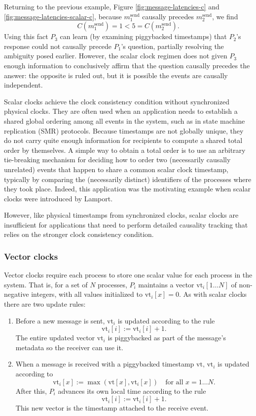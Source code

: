 \documentclass[]             %
{NASA}                       %
\theoremstyle{definition}
\begin{document}
Returning to the previous example, Figure \ref{fig:message-latencies-c} and
\ref{fig:message-latencies-scalar-c}, because $m_1^\textrm{send}$
causally precedes $m_2^\textrm{send}$, we find
\[C(m_1^\textrm{send}) = 1 < 5 = C(m_2^\textrm{send}).\] Using this
fact $P_3$ can learn (by examining piggybacked timestamps) that
$P_2$'s response could not causally precede $P_1$'s question,
partially resolving the ambiguity posed earlier. However, the scalar
clock regimen does not given $P_3$ enough information to conclusively
affirm that the question causally precedes the answer: the opposite is
ruled out, but it is possible the events are causally independent.

Scalar clocks achieve the clock consistency condition without
synchronized physical clocks. They are often used when an application
needs to establish a shared global ordering among all events in the
system, such as in state machine replication (SMR) protocols. Because
timestamps are not globally unique, they do not carry quite enough
information for recipients to compute a shared total order by
themselves. A simple way to obtain a total order is to use an
arbitrary tie-breaking mechanism for deciding how to order two
(necessarily causally unrelated) events that happen to share a common
scalar clock timestamp, typically by comparing the (necessarily
distinct) identifiers of the processes where they took place. Indeed,
this application was the motivating example when scalar clocks were
introduced by Lamport.

However, like physical timestamps from synchronized clocks, scalar
clocks are insufficient for applications that need to perform detailed
causality tracking that relies on the stronger clock consistency
condition.

\subsubsection{Vector clocks}
\newcommand{\vt}{\textrm{vt}}

Vector clocks require each process to store one scalar value for each
process in the system. That is, for a set of $N$ processes, $P_i$
maintains a vector $\vt_i[1 \ldots N]$ of non-negative integers, with
all values initialized to $\vt_i[x] = 0$. As with scalar clocks there
are two update rules:
\begin{enumerate}
\item Before a new message is sent, $\vt_i$ is updated according to the rule
  \[\vt_i[i] := \vt_i[i] + 1.\]
  The entire updated vector $\vt_i$ is piggybacked as part of the
  message's metadata so the receiver can use it.
\item When a message is received with a piggybacked timestamp $\vt$,
  $\vt_i$ is updated according to
  \[\vt_i[x] := \max(\vt[x], \vt_i[x]) \quad \textrm{for all $x = 1\ldots N$}.\]
  After this, $P_i$ advances its own local time according to the rule
  \[ \vt_i[i] := \vt_i[i] + 1.\]
  This new vector is the timestamp attached to the receive event.
\end{enumerate}
\end{document}
